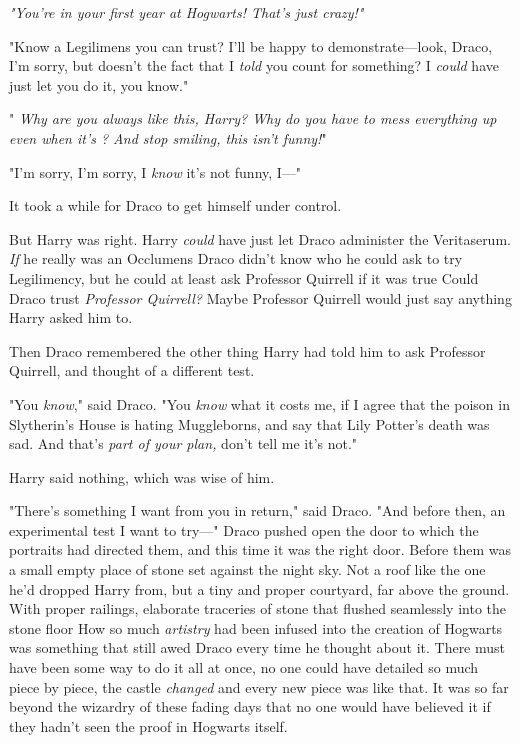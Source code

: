 \emph{"You're in your first year at Hogwarts! That's just crazy!"}

"Know a Legilimens you can trust? I'll be happy to demonstrate---look, Draco,
I'm sorry, but doesn't the fact that I \emph{told} you count for something? I
\emph{could} have just let you do it, you know."

"\emph{ Why are you always like this, Harry? Why do you have to mess
everything up even when it's ? And stop smiling, this isn't funny!}"

"I'm sorry, I'm sorry, I \emph{know} it's not funny, I\mbox{---}"

It took a while for Draco to get himself under control.

But Harry was right. Harry \emph{could} have just let Draco administer the
Veritaserum. \emph{If} he really was an Occlumens{\el} Draco didn't know who
he could ask to try Legilimency, but he could at least ask Professor Quirrell
if it was true{\el} Could Draco trust \emph{Professor Quirrell?} Maybe
Professor Quirrell would just say anything Harry asked him to.

Then Draco remembered the other thing Harry had told him to ask Professor
Quirrell, and thought of a different test.

"You \emph{know}," said Draco. "You \emph{know} what it costs me, if I agree
that the poison in Slytherin's House is hating Muggleborns, and say that Lily
Potter's death was sad. And that's \emph{part of your plan,} don't tell me it's
not."

Harry said nothing, which was wise of him.

"There's something I want from you in return," said Draco. "And before then, an
experimental test I want to try\mbox{---}"
\sbreak
Draco pushed open the door to which the portraits had directed them, and this
time it was the right door. Before them was a small empty place of stone set
against the night sky. Not a roof like the one he'd dropped Harry from, but a
tiny and proper courtyard, far above the ground. With proper railings,
elaborate traceries of stone that flushed seamlessly into the stone
floor{\el} How so much \emph{artistry} had been infused into the creation of
Hogwarts was something that still awed Draco every time he thought about it.
There must have been some way to do it all at once, no one could have detailed
so much piece by piece, the castle \emph{changed} and every new piece was like
that. It was so far beyond the wizardry of these fading days that no one would
have believed it if they hadn't seen the proof in Hogwarts itself.

